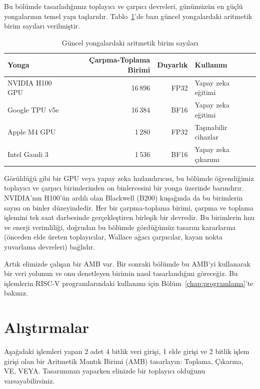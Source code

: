 Bu bölümde tasarladığımız toplayıcı ve çarpıcı devreleri, günümüzün en güçlü yongalarının temel yapı taşlarıdır. Tablo~\ref{tab:yonga-aritmetik}'de bazı güncel yongalardaki aritmetik birim sayıları verilmiştir.

\begin{table}[htbp]
\centering
\caption{Güncel yongalardaki aritmetik birim sayıları}
\label{tab:yonga-aritmetik}
\begin{tabular}{l r r l}
\toprule
\textbf{Yonga} & \textbf{Çarpma-Toplama Birimi} & \textbf{Duyarlık} & \textbf{Kullanım} \\
\midrule
NVIDIA H100 GPU     & 16\,896 & FP32 & Yapay zeka eğitimi \\
Google TPU v5e      & 16\,384 & BF16 & Yapay zeka eğitimi \\
Apple M4 GPU        & 1\,280  & FP32 & Taşınabilir cihazlar \\
Intel Gaudi 3       & 1\,536  & BF16 & Yapay zeka çıkarımı \\
\bottomrule
\end{tabular}
\end{table}

Görüldüğü gibi bir GPU veya yapay zeka hızlandırıcısı, bu bölümde öğrendiğimiz toplayıcı ve çarpıcı birimlerinden on binlercesini bir yonga üzerinde barındırır. NVIDIA'nın H100'ün ardılı olan Blackwell (B200) kuşağında da bu birimlerin sayısı on binler düzeyindedir. Her bir çarpma-toplama birimi, çarpma ve toplama işlemini tek saat darbesinde gerçekleştiren birleşik bir devredir. Bu birimlerin hızı ve enerji verimliliği, doğrudan bu bölümde gördüğümüz tasarım kararlarına (önceden elde üreten toplayıcılar, Wallace ağacı çarpıcılar, kayan nokta yuvarlama devreleri) bağlıdır.

Artık elimizde çalışan bir AMB var. Bir sonraki bölümde bu AMB'yi kullanarak bir veri yolunun ve onu denetleyen birimin nasıl tasarlandığını göreceğiz. Bu işlemlerin RISC-V programlarındaki kullanımı için Bölüm~\ref{chap:programlama}'te bakınız.


\section*{Alıştırmalar}

\begin{alistirma}[\orta]
Aşağıdaki işlemleri yapan 2 adet 4 bitlik veri girişi, 1 elde girişi ve 2 bitlik işlem girişi olan bir Aritmetik Mantık Birimi (AMB) tasarlayın: Toplama, Çıkarma, VE, VEYA. Tasarımınızı yaparken elinizde bir toplayıcı olduğunu varsayabilirsiniz.
\end{alistirma}

